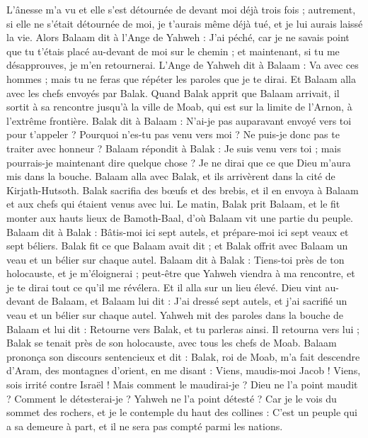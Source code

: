 \begin{multicols}{2}
L'ânesse m'a vu et elle s'est détournée de devant moi déjà trois fois ; autrement, si elle ne s'était détournée de moi, je t'aurais même déjà tué, et je lui aurais laissé la vie.
Alors Balaam dit à l'Ange de Yahweh : J'ai péché, car je ne savais point que tu t’étais placé au-devant de moi sur le chemin ; et maintenant, si tu me désapprouves, je m'en retournerai.
L'Ange de Yahweh dit à Balaam : Va avec ces hommes ; mais tu ne feras que répéter les paroles que je te dirai. Et Balaam alla avec les chefs envoyés par Balak.
Quand Balak apprit que Balaam arrivait, il sortit à sa rencontre jusqu’à la ville de Moab, qui est sur la limite de l'Arnon, à l’extrême frontière.
Balak dit à Balaam : N'ai-je pas auparavant envoyé vers toi pour t'appeler ? Pourquoi n'es-tu pas venu vers moi ? Ne puis-je donc pas te traiter avec honneur ?
Balaam répondit à Balak : Je suis venu vers toi ; mais pourrais-je maintenant dire quelque chose ? Je ne dirai que ce que Dieu m'aura mis dans la bouche.
Balaam alla avec Balak, et ils arrivèrent dans la cité de Kirjath-Hutsoth.
Balak sacrifia des bœufs et des brebis, et il en envoya à Balaam et aux chefs qui étaient venus avec lui.
Le matin, Balak prit Balaam, et le fit monter aux hauts lieux de Bamoth-Baal, d’où Balaam vit une partie du peuple.
\VerseOne{}Balaam dit à Balak : Bâtis-moi ici sept autels, et prépare-moi ici sept veaux et sept béliers.
Balak fit ce que Balaam avait dit ; et Balak offrit avec Balaam un veau et un bélier sur chaque autel.
Balaam dit à Balak : Tiens-toi près de ton holocauste, et je m’éloignerai ; peut-être que Yahweh viendra à ma rencontre, et je te dirai tout ce qu'il me révélera. Et il alla sur un lieu élevé.
Dieu vint au-devant de Balaam, et Balaam lui dit : J'ai dressé sept autels, et j'ai sacrifié un veau et un bélier sur chaque autel.
Yahweh mit des paroles dans la bouche de Balaam et lui dit : Retourne vers Balak, et tu parleras ainsi.
Il retourna vers lui ; Balak se tenait près de son holocauste, avec tous les chefs de Moab.
Balaam prononça son discours sentencieux et dit : Balak, roi de Moab, m'a fait descendre d'Aram, des montagnes d'orient, en me disant : Viens, maudis-moi Jacob ! Viens, sois irrité contre Israël !
Mais comment le maudirai-je ? Dieu ne l’a point maudit ?  Comment le détesterai-je ? Yahweh ne l’a point détesté ?
Car je le vois du sommet des rochers, et je le contemple du haut des collines : C’est un peuple qui a sa demeure à part, et il ne sera pas compté parmi les nations.

\end{multicols}
